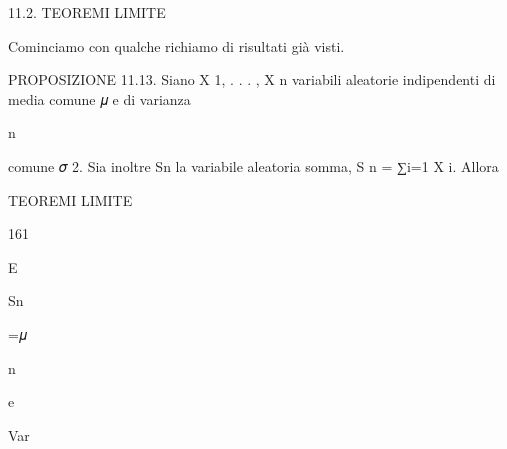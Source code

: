 \documentclass[a4paper,portrait,12pt]{article}
\begin{document}
\begin{flushleft}
11.2. TEOREMI LIMITE
\end{flushleft}


\begin{flushleft}
Cominciamo con qualche richiamo di risultati gi\`{a} visti.
\end{flushleft}


\begin{flushleft}
PROPOSIZIONE 11.13. Siano X 1, . . . , X n variabili aleatorie indipendenti di media comune 𝜇 e di varianza
\end{flushleft}


\begin{flushleft}
n
\end{flushleft}


\begin{flushleft}
comune 𝜎 2. Sia inoltre Sn la variabile aleatoria somma, S n = ∑i=1 X i. Allora
\end{flushleft}





\begin{flushleft}
 TEOREMI LIMITE
\end{flushleft}





161





\begin{flushleft}
E
\end{flushleft}





\begin{flushleft}
Sn
\end{flushleft}


\begin{flushleft}
=𝜇
\end{flushleft}


\begin{flushleft}
n
\end{flushleft}





\begin{flushleft}
e
\end{flushleft}





\begin{flushleft}
Var
\end{flushleft}
\end{document}
